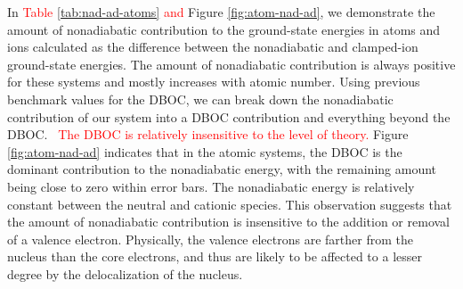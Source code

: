 \documentclass[aip,jcp,numerical,reprint]{revtex4-1}
\begin{document}
In \textcolor{red}{Table \ref{tab:nad-ad-atoms} and} Figure \ref{fig:atom-nad-ad}, we demonstrate the amount of nonadiabatic contribution to the ground-state energies in atoms and ions calculated as the difference between the nonadiabatic and clamped-ion ground-state energies. The amount of nonadiabatic contribution is always positive for these systems and mostly increases with atomic number. Using previous benchmark values for the DBOC, we can break down the nonadiabatic contribution of our system into a DBOC contribution and everything beyond the DBOC.~\cite{Klopper_DBOC,CFOUR,Harding} \textcolor{red}{The DBOC is relatively insensitive to the level of theory.} Figure \ref{fig:atom-nad-ad} indicates that in the atomic systems, the DBOC is the dominant contribution to the nonadiabatic energy, with the remaining amount being close to zero within error bars. The nonadiabatic energy is relatively constant between the neutral and cationic species. This observation suggests that the amount of nonadiabatic contribution is insensitive to the addition or removal of a valence electron. Physically, the valence electrons are farther from the nucleus than the core electrons, and thus are likely to be affected to a lesser degree by the delocalization of the nucleus. 
\end{document}
